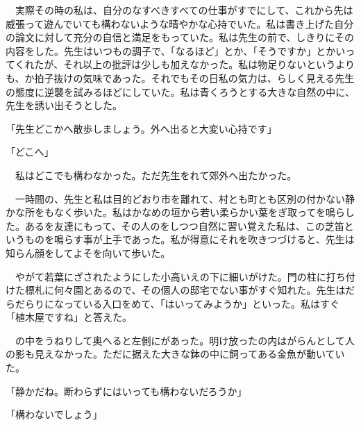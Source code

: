 \documentclass[a4j,onecolumn]{tarticle}
\begin{document}
　実際その時の私は、\hbox{}自分のなすべきすべての仕事がすでにして、\hbox{}これから先は威張って遊んでいても構わないような晴やかな心持でいた。\hbox{}私は書き上げた自分の論文に対して充分の自信と満足をもっていた。\hbox{}私は先生の前で、\hbox{}しきりにその内容をした。\hbox{}先生はいつもの調子で、\hbox{}「なるほど」とか、\hbox{}「そうですか」とかいってくれたが、\hbox{}それ以上の批評は少しも加えなかった。\hbox{}私は物足りないというよりも、\hbox{}か拍子抜けの気味であった。\hbox{}それでもその日私の気力は、\hbox{}らしく見える先生の態度に逆襲を試みるほどにしていた。\hbox{}私は青くろうとする大きな自然の中に、\hbox{}先生を誘い出そうとした。\hbox{}\par{}
「先生どこかへ散歩しましょう。\hbox{}外へ出ると大変い心持です」\par{}
「どこへ」\par{}
　私はどこでも構わなかった。\hbox{}ただ先生をれて郊外へ出たかった。\hbox{}\par{}
　一時間の、\hbox{}先生と私は目的どおり市を離れて、\hbox{}村とも町とも区別の付かない静かな所をもなく歩いた。\hbox{}私はかなめの垣から若い柔らかい葉をぎ取ってを鳴らした。\hbox{}あるを友達にもって、\hbox{}その人のをしつつ自然に習い覚えた私は、\hbox{}この芝笛というものを鳴らす事が上手であった。\hbox{}私が得意にそれを吹きつづけると、\hbox{}先生は知らん顔をしてよそを向いて歩いた。\hbox{}\par{}
　やがて若葉にざされたようにした小高いえの下に細いがけた。\hbox{}門の柱に打ち付けた標札に何々園とあるので、\hbox{}その個人の邸宅でない事がすぐ知れた。\hbox{}先生はだらだらりになっている入口をめて、\hbox{}「はいってみようか」といった。\hbox{}私はすぐ「植木屋ですね」と答えた。\hbox{}\par{}
　の中をうねりして奥へると左側にがあった。\hbox{}明け放ったの内はがらんとして人の影も見えなかった。\hbox{}ただに据えた大きな鉢の中に飼ってある金魚が動いていた。\hbox{}\par{}
「静かだね。\hbox{}断わらずにはいっても構わないだろうか」\par{}
「構わないでしょう」\par{}
\end{document}
